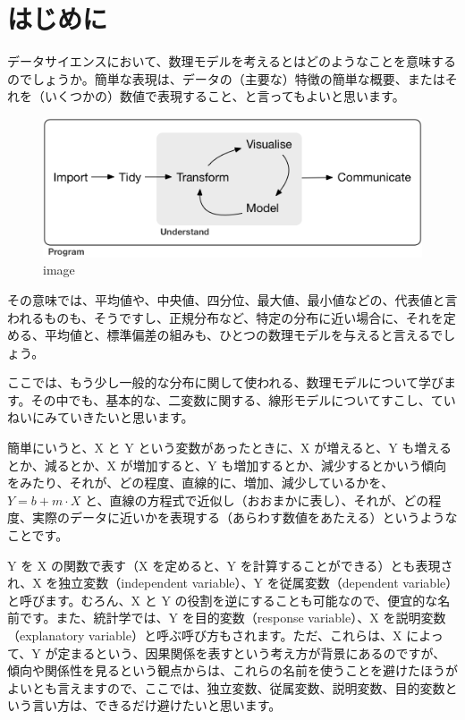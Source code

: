 \documentclass[
  xelatex, ja=standard]{bxjsbook}
\theoremstyle{definition}
\theoremstyle{definition}
\theoremstyle{definition}
\theoremstyle{definition}
\theoremstyle{remark}
\begin{document}
\hypertarget{ux306fux3058ux3081ux306b-4}{%
\section{はじめに}\label{ux306fux3058ux3081ux306b-4}}

データサイエンスにおいて、数理モデルを考えるとはどのようなことを意味するのでしょうか。簡単な表現は、データの（主要な）特徴の簡単な概要、またはそれを（いくつかの）数値で表現すること、と言ってもよいと思います。

\begin{figure}
\centering
\includegraphics{data/data-science.png}
\caption{image}
\end{figure}

その意味では、平均値や、中央値、四分位、最大値、最小値などの、代表値と言われるものも、そうですし、正規分布など、特定の分布に近い場合に、それを定める、平均値と、標準偏差の組みも、ひとつの数理モデルを与えると言えるでしょう。

ここでは、もう少し一般的な分布に関して使われる、数理モデルについて学びます。その中でも、基本的な、二変数に関する、線形モデルについてすこし、ていねいにみていきたいと思います。

簡単にいうと、X と Y という変数があったときに、X が増えると、Y も増えるとか、減るとか、X が増加すると、Y も増加するとか、減少するとかいう傾向をみたり、それが、どの程度、直線的に、増加、減少しているかを、\(Y = b + m\cdot X\) と、直線の方程式で近似し（おおまかに表し）、それが、どの程度、実際のデータに近いかを表現する（あらわす数値をあたえる）というようなことです。

Y を X の関数で表す（X を定めると、Y を計算することができる）とも表現され、X を独立変数（independent variable）、Y を従属変数（dependent variable）と呼びます。むろん、X と Y の役割を逆にすることも可能なので、便宜的な名前です。また、統計学では、Y を目的変数（response variable）、X を説明変数（explanatory variable）と呼ぶ呼び方もされます。ただ、これらは、X によって、Y が定まるという、因果関係を表すという考え方が背景にあるのですが、傾向や関係性を見るという観点からは、これらの名前を使うことを避けたほうがよいとも言えますので、ここでは、独立変数、従属変数、説明変数、目的変数という言い方は、できるだけ避けたいと思います。
\end{document}
